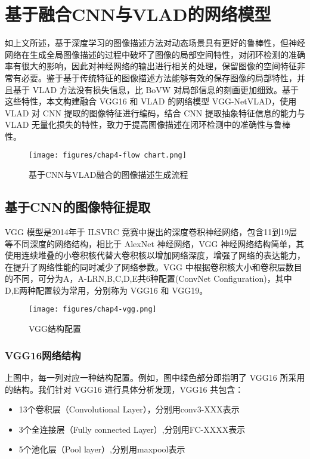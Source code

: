 \chapter{基于融合CNN与VLAD的网络模型}
如上文所述，基于深度学习的图像描述方法对动态场景具有更好的鲁棒性，但神经网络在生成全局图像描述的过程中破坏了图像的局部空间特性，对闭环检测的准确率有很大的影响，因此对神经网络的输出进行相关的处理，保留图像的空间特征非常有必要。鉴于基于传统特征的图像描述方法能够有效的保存图像的局部特性，并且基于 VLAD 方法没有损失信息，比 BoVW 对局部信息的刻画更加细致。基于这些特性，本文构建融合 VGG16 和 VLAD 的网络模型 VGG-NetVLAD，使用 VLAD 对 CNN 提取的图像特征进行编码，结合 CNN 提取抽象特征信息的能力与 VLAD 无量化损失的特性，致力于提高图像描述在闭环检测中的准确性与鲁棒性。

\begin{figure}[htbp]
	\centering
	\texttt{[image: figures/chap4-flow chart.png]}
	\caption{基于CNN与VLAD融合的图像描述生成流程}
\end{figure}

\section{基于CNN的图像特征提取}
VGG 模型是2014年于 ILSVRC 竞赛中提出的深度卷积神经网络，包含11到19层等不同深度的网络结构，相比于 AlexNet 神经网络，VGG 神经网络结构简单，其使用连续堆叠的小卷积核代替大卷积核以增加网络深度，增强了网络的表达能力，在提升了网络性能的同时减少了网络参数。VGG 中根据卷积核大小和卷积层数目的不同，可分为A，A-LRN,B,C,D,E共6种配置(ConvNet Configuration)，其中D,E两种配置较为常用，分别称为 VGG16 和 VGG19。

\begin{figure}[H]
	\centering
	\texttt{[image: figures/chap4-vgg.png]}
	\caption{VGG结构配置}
	\label{vgg_con}
\end{figure}

\subsection{VGG16网络结构}
上图中，每一列对应一种结构配置。例如，图中绿色部分即指明了 VGG16 所采用的结构。我们针对 VGG16 进行具体分析发现，VGG16 共包含：

\begin{itemize}
\item13个卷积层（Convolutional Layer），分别用conv3-XXX表示

\item3个全连接层（Fully connected Layer）,分别用FC-XXXX表示

\item5个池化层（Pool layer）,分别用maxpool表示
\end{itemize}

